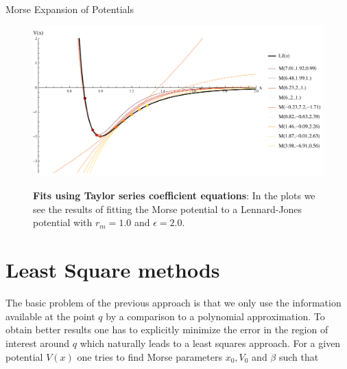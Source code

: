 \begin{chapter}{Morse Expansion of Potentials}
\begin{figure}[h!]
    \centering
\includegraphics[width=1.2\linewidth]{./figures/MorseFitsTaylor/taylorfitsAll.pdf}
    \\

       \caption[Fits using Taylor series coefficient equations]{\textbf{Fits using Taylor series coefficient equations}:
	In the plots we see the results of fitting the Morse potential to a Lennard-Jones potential with $r_m=1.0$ and $\epsilon=2.0$.
	    \label{fig:MorseFitsTaylor}
    }

\end{figure}



\section{Least Square methods} %
\label{sec:LeastSquareMethods}
The basic problem of the previous approach is that we only use the information available at the point $q$ by a comparison to a polynomial approximation.
To obtain better results one has to explicitly minimize the error in the region of interest around $q$ which naturally leads to a least squares 
approach. For a given potential $V(x)$ one tries to find  Morse parameters $x_0, V_0$ and $\beta$ such that


\end{chapter}
